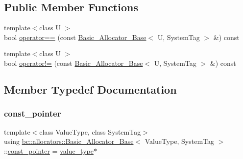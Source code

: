 \subsection*{Public Member Functions}
\begin{DoxyCompactItemize}
\item 
{\footnotesize template$<$class U $>$ }\\bool \hyperlink{structbc_1_1allocators_1_1Basic__Allocator__Base_ab70dcd6aa078ce7b3d5a43c36397d8e9}{operator==} (const \hyperlink{structbc_1_1allocators_1_1Basic__Allocator__Base}{Basic\+\_\+\+Allocator\+\_\+\+Base}$<$ U, System\+Tag $>$ \&) const
\item 
{\footnotesize template$<$class U $>$ }\\bool \hyperlink{structbc_1_1allocators_1_1Basic__Allocator__Base_a595df39ca6edee505366ff39ab6d2a4f}{operator!=} (const \hyperlink{structbc_1_1allocators_1_1Basic__Allocator__Base}{Basic\+\_\+\+Allocator\+\_\+\+Base}$<$ U, System\+Tag $>$ \&) const
\end{DoxyCompactItemize}


\subsection{Member Typedef Documentation}
\mbox{\label{structbc_1_1allocators_1_1Basic__Allocator__Base_ac6e458ef842011190bc702a5e373850a}} 
\subsubsection{\texorpdfstring{const\+\_\+pointer}{const\_pointer}}
{\footnotesize\ttfamily template$<$class Value\+Type, class System\+Tag$>$ \\
using \hyperlink{structbc_1_1allocators_1_1Basic__Allocator__Base}{bc\+::allocators\+::\+Basic\+\_\+\+Allocator\+\_\+\+Base}$<$ Value\+Type, System\+Tag $>$\+::\hyperlink{structbc_1_1allocators_1_1Basic__Allocator__Base_ac6e458ef842011190bc702a5e373850a}{const\+\_\+pointer} =  \hyperlink{structbc_1_1allocators_1_1Basic__Allocator__Base_a7d9eca7878880a820908b57bdcb94501}{value\+\_\+type}$\ast$}

